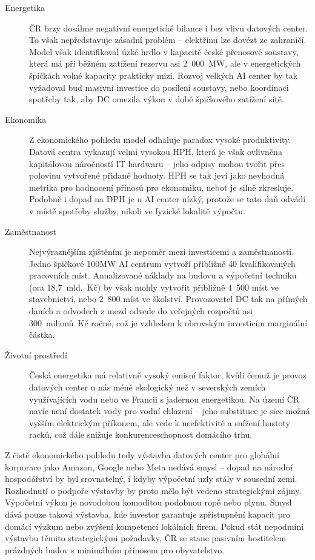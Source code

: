 \begin{description}
    
    \item[Energetika] ČR brzy dosáhne negativní energetické bilance i bez vlivu datových center. To však nepředstavuje zásadní problém -- elektřinu lze dovézt ze zahraničí. Model však identifikoval úzké hrdlo v kapacitě české přenosové soustavy, která má při běžném zatížení rezervu asi 2~000~MW, ale v energetických špičkách volné kapacity prakticky mizí. Rozvoj velkých AI center by tak vyžadoval buď masivní investice do posílení soustavy, nebo koordinaci spotřeby tak, aby DC omezila výkon v době špičkového zatížení sítě.
   
    \item[Ekonomika] Z ekonomického pohledu model odhaluje paradox vysoké produktivity. Datová centra vykazují velmi vysokou HPH, která je však ovlivněna kapitálovou náročností IT hardwaru -- jeho odpisy mohou tvořit přes polovinu vytvořené přidané hodnoty. HPH se tak jeví jako nevhodná metrika pro hodnocení přínosů pro ekonomiku, neboť je silně zkresluje. Podobně i dopad na DPH je u AI center nízký, protože se tato daň odvádí v místě spotřeby služby, nikoli ve fyzické lokalitě výpočtu.
    
    \item[Zaměstnanost] Nejvýraznějším zjištěním je nepoměr mezi investicemi a zaměstnaností. Jedno špičkové 100MW AI centrum vytvoří přibližně 40 kvalifikovaných pracovních míst. Anualizované náklady na budovu a výpočetní techniku (cca 18,7~mld.~Kč) by však mohly vytvořit přibližně 4~500 míst ve stavebnictví, nebo 2~800 míst ve školství. Provozovatel DC tak na přímých daních a odvodech z mezd odvede do veřejných rozpočtů asi 300~milionů~Kč ročně, což je vzhledem k obrovským investicím marginální částka.
    
    \item[Životní prostředí] Česká energetika má relativně vysoký emisní faktor, kvůli čemuž je provoz datových center u nás méně ekologický než v severských zemích využívajících vodu nebo ve Francii s jadernou energetikou. Na území ČR navíc není dostatek vody pro vodní chlazení -- jeho substituce je sice možná vyšším elektrickým příkonem, ale vede k neefektivitě a snížení hustoty racků, což dále snižuje konkurenceschopnost domácího trhu.

\end{description}

Z čistě ekonomického pohledu tedy výstavba datových center pro globální korporace jako Amazon, Google nebo Meta nedává smysl -- dopad na národní hospodářství by byl srovnatelný, i kdyby výpočetní uzly stály v sousední zemi. Rozhodnutí o podpoře výstavby by proto mělo být vedeno strategickými zájmy. Výpočetní výkon je novodobou komoditou podobnou ropě nebo plynu. Smysl dává pouze taková výstavba, kde investor garantuje zpřístupnění kapacit pro domácí výzkum nebo zvýšení kompetencí lokálních firem. Pokud stát nepodmíní výstavbu těmito strategickými požadavky, ČR se stane pasivním hostitelem prázdných budov s minimálním přínosem pro obyvatelstvo.

